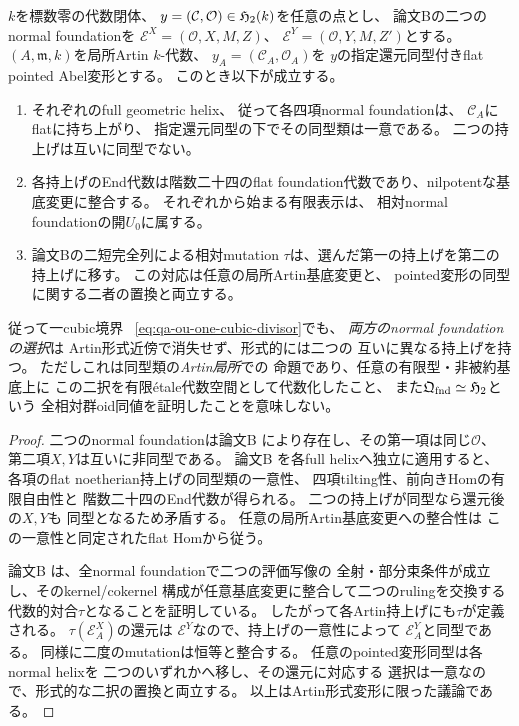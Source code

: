 \begin{proposition}[Artin変形上の二つの内在的rulingと相対mutation]
\label{prop:qa-ou-formal-two-ruling-lifts}
$k$を標数零の代数閉体、
$y=(\mathcal C,\mathcal O)\in\mathfrak H_2(k)$を任意の点とし、
論文Bの二つのnormal foundationを
$\mathcal E^X=(\mathcal O,X,M,Z)$、
$\mathcal E^Y=(\mathcal O,Y,M,Z')$とする。
$(A,\mathfrak m,k)$を局所Artin $k$-代数、
$y_A=(\mathcal C_A,\mathcal O_A)$を
$y$の指定還元同型付きflat pointed Abel変形とする。
このとき以下が成立する。
\begin{enumerate}
\item それぞれのfull geometric helix、
従って各四項normal foundationは、
$\mathcal C_A$にflatに持ち上がり、
指定還元同型の下でその同型類は一意である。
二つの持上げは互いに同型でない。
\item 各持上げのEnd代数は階数二十四のflat
foundation代数であり、nilpotentな基底変更に整合する。
それぞれから始まる有限表示は、
相対normal foundationの開$U_0$に属する。
\item 論文Bの二短完全列による相対mutation
$\tau$は、選んだ第一の持上げを第二の持上げに移す。
この対応は任意の局所Artin基底変更と、
pointed変形の同型に関する二者の置換と両立する。
\end{enumerate}
従って一cubic境界
~\eqref{eq:qa-ou-one-cubic-divisor}でも、
\emph{両方のnormal foundationの選択}は
Artin形式近傍で消失せず、形式的には二つの
互いに異なる持上げを持つ。
ただしこれは同型類の\emph{Artin局所}での
命題であり、任意の有限型・非被約基底上に
この二択を有限étale代数空間として代数化したこと、
また$\mathfrak Q_{\mathrm{fnd}}\simeq\mathfrak H_2$という
全相対群oid同値を証明したことを意味しない。
\end{proposition}
\begin{proof}
二つのnormal foundationは論文B
\cite[\texttt{cor:two-intrinsic-foundations}]{QuadricModuli2026}
により存在し、その第一項は同じ$\mathcal O$、
第二項$X,Y$は互いに非同型である。
論文B
\cite[\texttt{thm:artin-foundation-lift}]{QuadricModuli2026}
を各full helixへ独立に適用すると、
各項のflat noetherian持上げの同型類の一意性、
四項tilting性、前向きHomの有限自由性と
階数二十四のEnd代数が得られる。
二つの持上げが同型なら還元後の$X,Y$も
同型となるため矛盾する。
任意の局所Artin基底変更への整合性は
この一意性と同定されたflat Homから従う。

論文B
\cite[\texttt{prop:ruling-involution-mutation},
\texttt{prop:relative-ruling-involution}]{QuadricModuli2026}
は、全normal foundationで二つの評価写像の
全射・部分束条件が成立し、そのkernel/cokernel
構成が任意基底変更に整合して二つのrulingを交換する
代数的対合$\tau$となることを証明している。
したがって各Artin持上げにも$\tau$が定義される。
$\tau(\mathcal E_A^X)$の還元は
$\mathcal E^Y$なので、持上げの一意性によって
$\mathcal E_A^Y$と同型である。
同様に二度のmutationは恒等と整合する。
任意のpointed変形同型は各normal helixを
二つのいずれかへ移し、その還元に対応する
選択は一意なので、形式的な二択の置換と両立する。
以上はArtin形式変形に限った議論である。
\end{proof}

